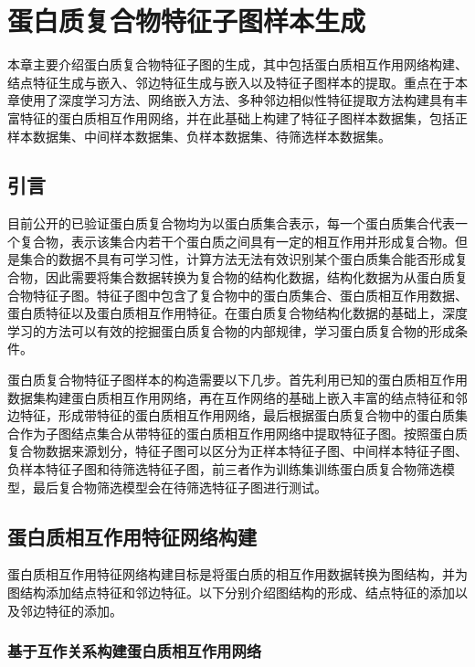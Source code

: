 \chapter{蛋白质复合物特征子图样本生成}
\label{chapter:featSubNetworkConstruct}

本章主要介绍蛋白质复合物特征子图的生成，其中包括蛋白质相互作用网络构建、结点特征生成与嵌入、邻边特征生成与嵌入以及特征子图样本的提取。重点在于本章使用了深度学习方法、网络嵌入方法、多种邻边相似性特征提取方法构建具有丰富特征的蛋白质相互作用网络，并在此基础上构建了特征子图样本数据集，包括正样本数据集、中间样本数据集、负样本数据集、待筛选样本数据集。

\section{引言}
\label{section:featSubNetworkConstruct:intro}

目前公开的已验证蛋白质复合物均为以蛋白质集合表示，每一个蛋白质集合代表一个复合物，表示该集合内若干个蛋白质之间具有一定的相互作用并形成复合物。但是集合的数据不具有可学习性，计算方法无法有效识别某个蛋白质集合能否形成复合物，因此需要将集合数据转换为复合物的结构化数据，结构化数据为从蛋白质复合物特征子图。特征子图中包含了复合物中的蛋白质集合、蛋白质相互作用数据、蛋白质特征以及蛋白质相互作用特征。在蛋白质复合物结构化数据的基础上，深度学习的方法可以有效的挖掘蛋白质复合物的内部规律，学习蛋白质复合物的形成条件。

蛋白质复合物特征子图样本的构造需要以下几步。首先利用已知的蛋白质相互作用数据集构建蛋白质相互作用网络，再在互作网络的基础上嵌入丰富的结点特征和邻边特征，形成带特征的蛋白质相互作用网络，最后根据蛋白质复合物中的蛋白质集合作为子图结点集合从带特征的蛋白质相互作用网络中提取特征子图。按照蛋白质复合物数据来源划分，特征子图可以区分为正样本特征子图、中间样本特征子图、负样本特征子图和待筛选特征子图，前三者作为训练集训练蛋白质复合物筛选模型，最后复合物筛选模型会在待筛选特征子图进行测试。

\section{蛋白质相互作用特征网络构建}
\label{section:featSubNetworkConstruct:featPPINetwork}

蛋白质相互作用特征网络构建目标是将蛋白质的相互作用数据转换为图结构，并为图结构添加结点特征和邻边特征。以下分别介绍图结构的形成、结点特征的添加以及邻边特征的添加。

\subsection{基于互作关系构建蛋白质相互作用网络}
\label{subsection:featPPINetwork:networkConstruct}

